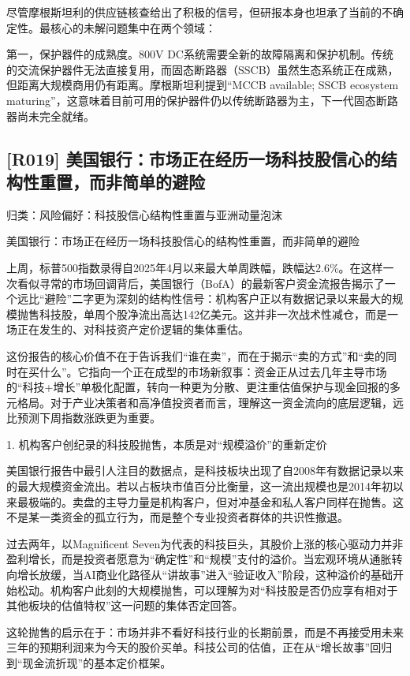 \documentclass[11pt]{ctexart}
\begin{document}
尽管摩根斯坦利的供应链核查给出了积极的信号，但研报本身也坦承了当前的不确定性。最核心的未解问题集中在两个领域：

第一，保护器件的成熟度。800V DC系统需要全新的故障隔离和保护机制。传统的交流保护器件无法直接复用，而固态断路器（SSCB）虽然生态系统正在成熟，但距离大规模商用仍有距离。摩根斯坦利提到“MCCB available; SSCB ecosystem maturing”，这意味着目前可用的保护器件仍以传统断路器为主，下一代固态断路器尚未完全就绪。

\subsection{[R019] 美国银行：市场正在经历一场科技股信心的结构性重置，而非简单的避险}
{\small\color{refgray}归类：风险偏好：科技股信心结构性重置与亚洲动量泡沫}

美国银行：市场正在经历一场科技股信心的结构性重置，而非简单的避险

上周，标普500指数录得自2025年4月以来最大单周跌幅，跌幅达2.6\%。在这样一次看似寻常的市场回调背后，美国银行（BofA）的最新客户资金流报告揭示了一个远比“避险”二字更为深刻的结构性信号：机构客户正以有数据记录以来最大的规模抛售科技股，单周个股净流出高达142亿美元。这并非一次战术性减仓，而是一场正在发生的、对科技资产定价逻辑的集体重估。

这份报告的核心价值不在于告诉我们“谁在卖”，而在于揭示“卖的方式”和“卖的同时在买什么”。它指向一个正在成型的市场新叙事：资金正从过去几年主导市场的“科技+增长”单极化配置，转向一种更为分散、更注重估值保护与现金回报的多元格局。对于产业决策者和高净值投资者而言，理解这一资金流向的底层逻辑，远比预测下周指数涨跌更为重要。

1. 机构客户创纪录的科技股抛售，本质是对“规模溢价”的重新定价

美国银行报告中最引人注目的数据点，是科技板块出现了自2008年有数据记录以来的最大规模资金流出。若以占板块市值百分比衡量，这一流出规模也是2014年初以来最极端的。卖盘的主导力量是机构客户，但对冲基金和私人客户同样在抛售。这不是某一类资金的孤立行为，而是整个专业投资者群体的共识性撤退。

过去两年，以Magnificent Seven为代表的科技巨头，其股价上涨的核心驱动力并非盈利增长，而是投资者愿意为“确定性”和“规模”支付的溢价。当宏观环境从通胀转向增长放缓，当AI商业化路径从“讲故事”进入“验证收入”阶段，这种溢价的基础开始松动。机构客户此刻的大规模抛售，可以理解为对“科技股是否仍应享有相对于其他板块的估值特权”这一问题的集体否定回答。

这轮抛售的启示在于：市场并非不看好科技行业的长期前景，而是不再接受用未来三年的预期利润来为今天的股价买单。科技公司的估值，正在从“增长故事”回归到“现金流折现”的基本定价框架。
\end{document}

